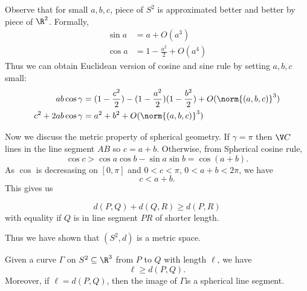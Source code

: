 \documentclass[a4paper]{article}
\begin{document}
\begin{remark}
  Observe that for small \(a, b, c\), piece of \(S^2\) is approximated better and better by piece of \(\R^2\). Formally,
  \begin{align*}
    \sin a &= a + O(a^3) \\
    \cos a &= 1 - \frac{a^2}{2} + O(a^4)
  \end{align*}
  Thus we can obtain Euclidean version of cosine and sine rule by setting \(a, b, c\) small:
  \begin{align*}
    ab\cos \gamma &= (1 - \frac{c^2}{2}) - (1 - \frac{a^2}{2})(1 - \frac{b^2}{2}) + O(\norm{(a, b, c)}^3) \\
    c^2 + 2ab \cos \gamma &= a^2 + b^2 + O(\norm{(a, b, c)}^3)
  \end{align*}
\end{remark}

Now we discuss the metric property of spherical geometry. If \(\gamma = \pi\) then \(\V C\) lines in the line segment \(AB\) so \(c = a + b\). Otherwise, from Spherical cosine rule,
\[
  \cos c > \cos a \cos b - \sin a \sin b = \cos(a + b).
\]
As \(\cos\) is decresasing on \([0, \pi]\) and \(0 < c < \pi\), \(0 < a + b < 2\pi\), we have
\[
  c < a + b.
\]
This gives us

\begin{corollary}
  \[
    d(P, Q) + d(Q, R) \geq d(P, R)
  \]
  with equality if \(Q\) is in line segment \(PR\) of shorter length.
\end{corollary}
Thus we have shown that \((S^2, d)\) is a metric space.

\begin{proposition}
  Given a curve \(\Gamma\) on \(S^2 \subseteq \R^3\) from \(P\) to \(Q\) with length \(\ell\), we have
  \[
    \ell \geq d(P, Q).
  \]
  Moreover, if \(\ell = d(P, Q)\), then the image of \(\Gamma\)is a spherical line segment.
\end{proposition}
\end{document}
